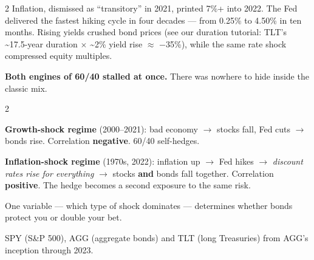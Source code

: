 \documentclass{pyportfolios-note}
\begin{document}
\noteneedroom{150bp}

\begin{multicols}{2}
Inflation, dismissed as ``transitory'' in 2021, printed 7\%+ into 2022. The Fed
delivered the fastest hiking cycle in four decades — from 0.25\% to 4.50\% in
ten months. Rising yields crushed bond prices (see our duration tutorial: TLT's
\textasciitilde17.5-year duration $\times$ \textasciitilde2\% yield rise
$\approx$ $-$35\%), while the same rate shock compressed equity multiples.

\textbf{Both engines of 60/40 stalled at once.} There was nowhere to hide inside
the classic mix.
\end{multicols}

\noteneedroom{170bp}

\begin{multicols}{2}
\begin{notebullets}
\item \textbf{Growth-shock regime} (2000–2021): bad economy $\rightarrow$ stocks
      fall, Fed cuts $\rightarrow$ bonds rise. Correlation \textbf{negative}.
      60/40 self-hedges.
\item \textbf{Inflation-shock regime} (1970s, 2022): inflation up $\rightarrow$
      Fed hikes $\rightarrow$ \textit{discount rates rise for everything}
      $\rightarrow$ stocks \textbf{and} bonds fall together. Correlation
      \textbf{positive}. The hedge becomes a second exposure to the same risk.
\end{notebullets}

One variable — which type of shock dominates — determines whether bonds protect
you or double your bet.
\end{multicols}

\noteneedroom{150bp}


SPY (S\&P 500), AGG (aggregate bonds) and TLT (long Treasuries) from AGG's
inception through 2023.
\end{document}
